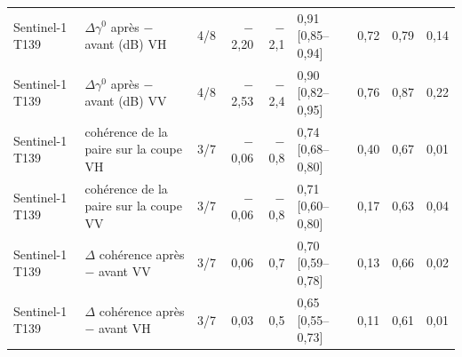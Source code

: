 \begin{table}[htbp]
\begin{tabular}{llcrrlrrr}
\addlinespace
Sentinel-1 T139 & $\Delta\gamma^0$ après $-$ avant (dB) VH & 4/8 & $-$2{,}20 & $-$2{,}1 & 0{,}91 [0{,}85--0{,}94] & 0{,}72 & 0{,}79 & 0{,}14 \\
Sentinel-1 T139 & $\Delta\gamma^0$ après $-$ avant (dB) VV & 4/8 & $-$2{,}53 & $-$2{,}4 & 0{,}90 [0{,}82--0{,}95] & 0{,}76 & 0{,}87 & 0{,}22 \\
Sentinel-1 T139 & cohérence de la paire sur la coupe VH & 3/7 & $-$0{,}06 & $-$0{,}8 & 0{,}74 [0{,}68--0{,}80] & 0{,}40 & 0{,}67 & 0{,}01 \\
Sentinel-1 T139 & cohérence de la paire sur la coupe VV & 3/7 & $-$0{,}06 & $-$0{,}8 & 0{,}71 [0{,}60--0{,}80] & 0{,}17 & 0{,}63 & 0{,}04 \\
Sentinel-1 T139 & $\Delta$ cohérence après $-$ avant VV & 3/7 & 0{,}06 & 0{,}7 & 0{,}70 [0{,}59--0{,}78] & 0{,}13 & 0{,}66 & 0{,}02 \\
Sentinel-1 T139 & $\Delta$ cohérence après $-$ avant VH & 3/7 & 0{,}03 & 0{,}5 & 0{,}65 [0{,}55--0{,}73] & 0{,}11 & 0{,}61 & 0{,}01 \\
\bottomrule
\end{tabular}
\end{table}
